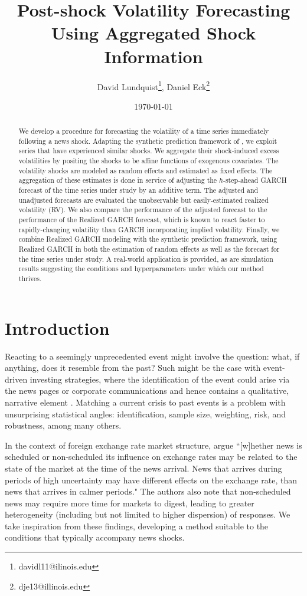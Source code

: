 \documentclass[11pt]{article}
\title{Post-shock Volatility Forecasting Using Aggregated Shock Information}
\author{David Lundquist\thanks{davidl11@ilinois.edu}, Daniel Eck\thanks{dje13@illinois.edu} }
\affil{Department of Statistics, University of Illinois at Urbana-Champaign}
\date{\today}
\theoremstyle{definition}
\begin{document}
\maketitle

\begin{abstract} 
We develop a procedure for forecasting the volatility of a time series immediately following a news shock.  Adapting the synthetic prediction framework of \citet{lin2021minimizing}, we exploit series that have experienced similar shocks.  We aggregate their shock-induced excess volatilities by positing the shocks to be affine functions of exogenous covariates.  The volatility shocks are modeled as random effects and estimated as fixed effects.  The aggregation of these estimates is done in service of adjusting the $h$-step-ahead GARCH forecast of the time series under study by an additive term.  The adjusted and unadjusted forecasts are evaluated the unobservable but easily-estimated realized volatility (RV).  We also compare the performance of the adjusted forecast to the performance of the Realized GARCH forecast, which is known to react faster to rapidly-changing volatility than GARCH incorporating implied volatility.  Finally, we combine Realized GARCH modeling with the synthetic prediction framework, using Realized GARCH in both the estimation of random effects as well as the forecast for the time series under study.  A real-world application is provided, as are simulation results suggesting the conditions and hyperparameters under which our method thrives.
\end{abstract}

\section{Introduction}

Reacting to a seemingly unprecedented event might involve the question: what, if anything, does it resemble from the past?  Such might be the case with event-driven investing strategies, where the identification of the event could arise via the news pages or corporate communications and hence contains a qualitative, narrative element \citep{Kenton}.  Matching a current crisis to past events is a problem with unsurprising statistical angles: identification, sample size, weighting, risk, and robustness, among many others.  

In the context of foreign exchange rate market structure, \citet{dominguez2006defines} argue ``[w]hether news is scheduled or non-scheduled its influence on exchange rates may be related
to the state of the market at the time of the news arrival.  News that arrives during periods of
high uncertainty may have different effects on the exchange rate, than news that arrives in
calmer periods." The authors also note that non-scheduled news may require more time for markets to digest, leading to greater heterogeneity (including but not limited to higher dispersion) of responses.  We take inspiration from these findings, developing a method suitable to the conditions that typically accompany news shocks. 
\end{document}
